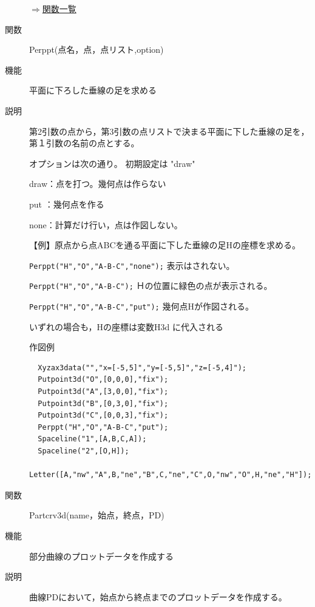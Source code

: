 \documentclass[papersize,a4paper,12pt,uplatex]{jsarticle}
\begin{document}
\begin{description}
\begin{flushright} \hyperlink{functionlist}{$\Rightarrow$関数一覧}\end{flushright}
\vspace{\baselineskip}

\hypertarget{perppt}{}
\item[関数]  Perppt(点名，点，点リスト,option)
\item[機能]  平面に下ろした垂線の足を求める
\item[説明]  第2引数の点から，第3引数の点リストで決まる平面に下した垂線の足を，第１引数の名前の点とする。

オプションは次の通り。 初期設定は "draw"

draw：点を打つ。幾何点は作らない

put ：幾何点を作る

none：計算だけ行い，点は作図しない。

\vspace{\baselineskip}
【例】原点から点ABCを通る平面に下した垂線の足Hの座標を求める。

 \verb|Perppt("H","O","A-B-C","none");|   表示はされない。
 
 \verb|Perppt("H","O","A-B-C");|         Ｈの位置に緑色の点が表示される。
 
 \verb|Perppt("H","O","A-B-C","put");|     幾何点Hが作図される。
 
  いずれの場合も，Hの座標は変数H3d に代入される
  
\vspace{\baselineskip}
作図例
\begin{verbatim}
  Xyzax3data("","x=[-5,5]","y=[-5,5]","z=[-5,4]");
  Putpoint3d("O",[0,0,0],"fix");
  Putpoint3d("A",[3,0,0],"fix");
  Putpoint3d("B",[0,3,0],"fix");
  Putpoint3d("C",[0,0,3],"fix");
  Perppt("H","O","A-B-C","put");
  Spaceline("1",[A,B,C,A]);
  Spaceline("2",[O,H]);
  Letter([A,"nw","A",B,"ne","B",C,"ne","C",O,"nw","O",H,"ne","H"]);
\end{verbatim}

\vspace{\baselineskip}
\begin{center}  \end{center}

\vspace{\baselineskip}
\hypertarget{partcrv3d}{}
\item[関数]  Partcrv3d(name，始点，終点，PD)
\item[機能]  部分曲線のプロットデータを作成する
\item[説明]  曲線PDにおいて，始点から終点までのプロットデータを作成する。


\end{description}
\end{document}

